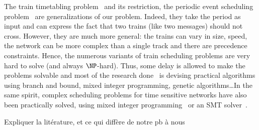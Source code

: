 The train timetabling problem~\cite{lusby2011railway} and its restriction, the periodic event scheduling problem~\cite{serafini1989mathematical} are generalizations of our problem. Indeed, they take the period as input and can express the fact that two trains (like two messages) should not cross. However, they are much more general: the trains can vary in size, speed, the network can be more complex than a single track and there are precedence constraints. Hence, the numerous variants of train scheduling problems are very hard to solve (and always $\NP$-hard). Thus, some delay is allowed to make the problems solvable and most of the research done~\cite{lusby2011railway} is devising practical algorithms using branch and bound, mixed integer programming, genetic algorithms\dots  In the same spirit, complex scheduling problems for time sensitive networks have also been practically solved, using mixed integer programming~\cite{nayak2017incremental,steiner2018traffic} or an SMT solver~\cite{dos2019tsnsched}.



Expliquer la litérature, et ce qui diffère de notre pb à nous